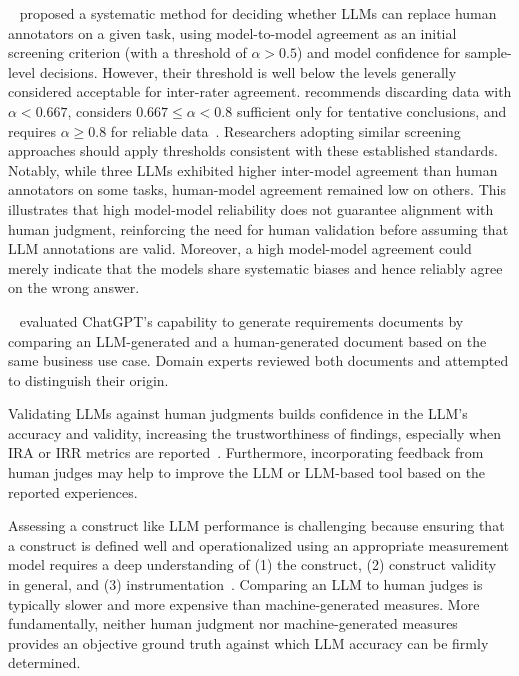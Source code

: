 
\citeauthor{DBLP:conf/msr/AhmedDTP25}~\cite{DBLP:conf/msr/AhmedDTP25} proposed a systematic method for deciding whether LLMs can replace human annotators on a given task, using model-to-model agreement as an initial screening criterion (with a threshold of $\alpha>0.5$) and model confidence for sample-level decisions. However, their threshold is well below the levels generally considered acceptable for inter-rater agreement.
\citeauthor{Krippendorff2018} recommends discarding data with $\alpha<0.667$, considers $0.667 \leq \alpha < 0.8$ sufficient only for tentative conclusions, and requires $\alpha \geq 0.8$ for reliable data~\cite{Krippendorff2018}. Researchers adopting similar screening approaches should apply thresholds consistent with these established standards. Notably, while three LLMs exhibited higher inter-model agreement than human annotators on some tasks, human-model agreement remained low on others.
This illustrates that high model-model reliability does not guarantee alignment with human judgment, reinforcing the need for human validation before assuming that LLM annotations are valid.
Moreover, a high model-model agreement could merely indicate that the models share systematic biases and hence reliably agree on the wrong answer.

\citet{hymel2025analysisllmsvshuman}~\cite{hymel2025analysisllmsvshuman} evaluated ChatGPT's capability to generate requirements documents by comparing an LLM-generated and a human-generated document based on the same business use case. Domain experts reviewed both documents and attempted to distinguish their origin.


Validating LLMs against human judgments builds confidence in the LLM's accuracy and validity, increasing the trustworthiness of findings, especially when IRA or IRR metrics are reported~\cite{khraisha2024canlargelanguagemodelshumans}. Furthermore, incorporating feedback from human judges may help to improve the LLM or LLM-based tool based on the reported experiences.


Assessing a construct like LLM performance is challenging because ensuring that a construct is defined well and operationalized using an appropriate measurement model requires a deep understanding of (1) the construct, (2) construct validity in general, and (3) instrumentation~\cite{DBLP:journals/tse/SjobergB23,ralph2024teaching}. Comparing an LLM to human judges is typically slower and more expensive than machine-generated measures. More fundamentally, neither human judgment nor machine-generated measures provides an objective ground truth against which LLM accuracy can be firmly determined.   

